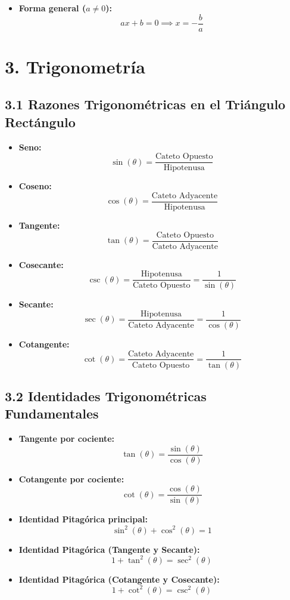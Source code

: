 \documentclass[11pt,a4paper]{article}
\begin{document}
\begin{itemize}
  \item \textbf{Forma general ($a \ne 0$):}
  \[
    ax + b = 0 \implies x = -\frac{b}{a}
  \]
\end{itemize}

\section*{3. Trigonometría}

\subsection*{3.1 Razones Trigonométricas en el Triángulo Rectángulo}

\begin{itemize}
  \item \textbf{Seno:}
  \[
    \sin(\theta) = \frac{\text{Cateto Opuesto}}{\text{Hipotenusa}}
  \]
  \item \textbf{Coseno:}
  \[
    \cos(\theta) = \frac{\text{Cateto Adyacente}}{\text{Hipotenusa}}
  \]
  \item \textbf{Tangente:}
  \[
    \tan(\theta) = \frac{\text{Cateto Opuesto}}{\text{Cateto Adyacente}}
  \]
  \item \textbf{Cosecante:}
  \[
    \csc(\theta) = \frac{\text{Hipotenusa}}{\text{Cateto Opuesto}} = \frac{1}{\sin(\theta)}
  \]
  \item \textbf{Secante:}
  \[
    \sec(\theta) = \frac{\text{Hipotenusa}}{\text{Cateto Adyacente}} = \frac{1}{\cos(\theta)}
  \]
  \item \textbf{Cotangente:}
  \[
    \cot(\theta) = \frac{\text{Cateto Adyacente}}{\text{Cateto Opuesto}} = \frac{1}{\tan(\theta)}
  \]
\end{itemize}

\subsection*{3.2 Identidades Trigonométricas Fundamentales}

\begin{itemize}
  \item \textbf{Tangente por cociente:}
  \[
    \tan(\theta) = \frac{\sin(\theta)}{\cos(\theta)}
  \]
  \item \textbf{Cotangente por cociente:}
  \[
    \cot(\theta) = \frac{\cos(\theta)}{\sin(\theta)}
  \]
  \item \textbf{Identidad Pitagórica principal:}
  \[
    \sin^2(\theta) + \cos^2(\theta) = 1
  \]
  \item \textbf{Identidad Pitagórica (Tangente y Secante):}
  \[
    1 + \tan^2(\theta) = \sec^2(\theta)
  \]
  \item \textbf{Identidad Pitagórica (Cotangente y Cosecante):}
  \[
    1 + \cot^2(\theta) = \csc^2(\theta)
  \]
\end{itemize}
\end{document}
